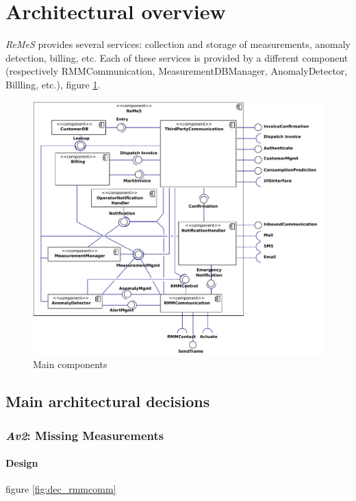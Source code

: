 \documentclass[a4paper,10pt]{article}
\newcommand{\rem}{\emph{ReMeS}\xspace}
\begin{document}
\section{Architectural overview}\label{sec:main-decomposition}
\rem provides several services: collection and storage of measurements, anomaly detection, billing, etc.
Each of these services is provided by a different component (respectively RMMCommunication, MeasurementDBManager, AnomalyDetector, Billling, etc.), figure \ref{fig:cc-primary}.

\begin{figure}[!htp]
    \centering
    \includegraphics[width=\textwidth]{Main_Component_Diagram}
    \caption{Main components}\label{fig:cc-primary}
\end{figure}

\subsection{Main architectural decisions}

\subsubsection{\emph{Av2}: Missing Measurements}

\paragraph{Design} figure \ref{fig:dec_rmmcomm}
\end{document}
